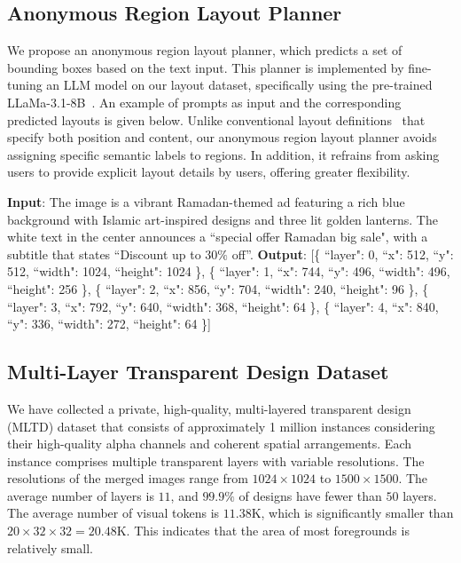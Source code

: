 \subsection{Anonymous Region Layout Planner} \label{sec:method:planner}

We propose an anonymous region layout planner, which predicts a set of bounding boxes based on the text input. This planner is implemented by fine-tuning an LLM model on our layout dataset, specifically using the pre-trained LLaMa-3.1-8B~\cite{dubey2024llama}. An example of prompts as input and the corresponding predicted layouts is given below. Unlike conventional layout definitions~\cite{kong2022blt,jiang2023layoutformer++,jia2023cole,inoue2024opencole} that specify both position and content, our anonymous region layout planner avoids assigning specific semantic labels to regions. In addition, it refrains from asking users to provide explicit layout details by users, offering greater flexibility.

\begin{contentagnosticlayout}
	\textbf{Input}: The image is a vibrant Ramadan-themed ad featuring a rich blue background with Islamic art-inspired designs and three lit golden lanterns. The white text in the center announces a ``special offer Ramadan big sale", with a subtitle that states ``Discount up to $30\%$ off''.
	\textbf{Output}:  [\{
		``layer": 0,
		``x": 512,
		``y": 512,
		``width": 1024,
		``height": 1024
	\},
	\{
		``layer": 1,
		``x": 744,
		``y": 496,
		``width": 496,
		``height": 256
	\},
	\{
		``layer": 2,
		``x": 856,
		``y": 704,
		``width": 240,
		``height": 96
	\},
	\{
		``layer": 3,
		``x": 792,
		``y": 640,
		``width": 368,
		``height": 64
	\},
	\{
		``layer": 4,
		``x": 840,
		``y": 336,
		``width": 272,
		``height": 64
	\}]
\end{contentagnosticlayout}

\subsection{Multi-Layer Transparent Design Dataset}
We have collected a private, high-quality, multi-layered transparent design (MLTD) dataset that consists of approximately 1 million instances considering their high-quality alpha channels and coherent spatial arrangements. Each instance comprises multiple transparent layers with variable resolutions. The resolutions of the merged images range from $1024\times1024$ to $1500\times1500$.
The average number of layers is $11$, and $99.9\%$ of designs have fewer than $50$ layers. The average number of visual tokens is $11.38$K, which is significantly smaller than $20 \times 32 \times 32 = 20.48$K. This indicates that the area of most foregrounds is relatively small.

